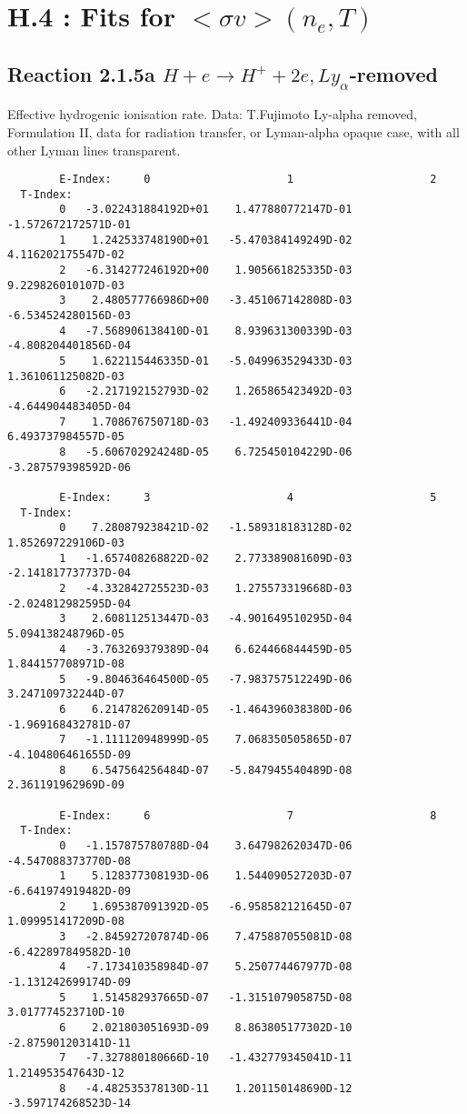 \documentclass[12pt,dvipdfmx]{article}
\begin{document}
\section{H.4 :  Fits for $<\sigma v> (n_e,T)$}

\subsection{
Reaction 2.1.5a  $H + e \rightarrow H^+ + 2e, Ly_\alpha$-removed }

   Effective hydrogenic ionisation rate. Data: T.Fujimoto
   Ly-alpha removed, Formulation II, data for radiation transfer,
   or Lyman-alpha opaque case, with all other Lyman lines transparent.

\begin{small}\begin{verbatim}
        E-Index:     0                     1                     2
  T-Index:
        0   -3.022431884192D+01    1.477880772147D-01   -1.572672172571D-01
        1    1.242533748190D+01   -5.470384149249D-02    4.116202175547D-02
        2   -6.314277246192D+00    1.905661825335D-03    9.229826010107D-03
        3    2.480577766986D+00   -3.451067142808D-03   -6.534524280156D-03
        4   -7.568906138410D-01    8.939631300339D-03   -4.808204401856D-04
        5    1.622115446335D-01   -5.049963529433D-03    1.361061125082D-03
        6   -2.217192152793D-02    1.265865423492D-03   -4.644904483405D-04
        7    1.708676750718D-03   -1.492409336441D-04    6.493737984557D-05
        8   -5.606702924248D-05    6.725450104229D-06   -3.287579398592D-06

        E-Index:     3                     4                     5
  T-Index:
        0    7.280879238421D-02   -1.589318183128D-02    1.852697229106D-03
        1   -1.657408268822D-02    2.773389081609D-03   -2.141817737737D-04
        2   -4.332842725523D-03    1.275573319668D-03   -2.024812982595D-04
        3    2.608112513447D-03   -4.901649510295D-04    5.094138248796D-05
        4   -3.763269379389D-04    6.624466844459D-05    1.844157708971D-08
        5   -9.804636464500D-05   -7.983757512249D-06    3.247109732244D-07
        6    6.214782620914D-05   -1.464396038380D-06   -1.969168432781D-07
        7   -1.111120948999D-05    7.068350505865D-07   -4.104806461655D-09
        8    6.547564256484D-07   -5.847945540489D-08    2.361191962969D-09

        E-Index:     6                     7                     8
  T-Index:
        0   -1.157875780788D-04    3.647982620347D-06   -4.547088373770D-08
        1    5.128377308193D-06    1.544090527203D-07   -6.641974919482D-09
        2    1.695387091392D-05   -6.958582121645D-07    1.099951417209D-08
        3   -2.845927207874D-06    7.475887055081D-08   -6.422897849582D-10
        4   -7.173410358984D-07    5.250774467977D-08   -1.131242699174D-09
        5    1.514582937665D-07   -1.315107905875D-08    3.017774523710D-10
        6    2.021803051693D-09    8.863805177302D-10   -2.875901203141D-11
        7   -7.327880180666D-10   -1.432779345041D-11    1.214953547643D-12
        8   -4.482535378130D-11    1.201150148690D-12   -3.597174268523D-14


\end{verbatim}
\end{small}
\end{document}
